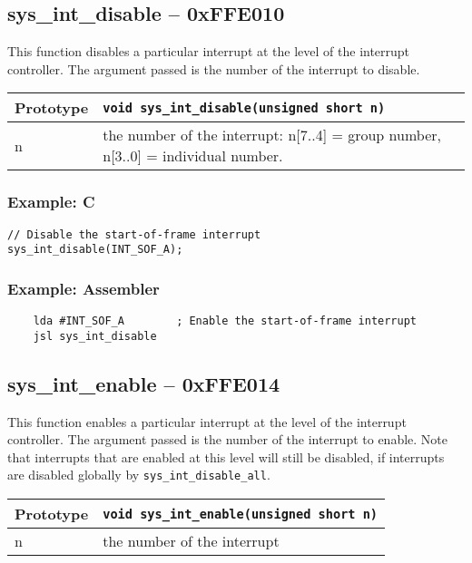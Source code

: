 \subsection*{sys\_int\_disable -- 0xFFE010}
This function disables a particular interrupt at the level of the interrupt controller. The argument passed is the number of the interrupt to disable.

\bigskip

\begin{tabular}{|l||l|} \hline
Prototype & \lstinline!void sys_int_disable(unsigned short n)! \\ \hline
n & the number of the interrupt: n[7..4] = group number, n[3..0] = individual number. \\ \hline
\end{tabular}

\subsubsection*{Example: C}
\begin{lstlisting}
// Disable the start-of-frame interrupt
sys_int_disable(INT_SOF_A);
\end{lstlisting}

\subsubsection*{Example: Assembler}
\begin{verbatim}
    lda #INT_SOF_A        ; Enable the start-of-frame interrupt
    jsl sys_int_disable
\end{verbatim}

\subsection*{sys\_int\_enable -- 0xFFE014}
This function enables a particular interrupt at the level of the interrupt controller. The argument passed is the number of the interrupt to enable. Note that interrupts that are enabled at this level will still be disabled, if interrupts are disabled globally by \verb+sys_int_disable_all+.

\bigskip

\begin{tabular}{|l||l|} \hline
Prototype & \lstinline!void sys_int_enable(unsigned short n)! \\ \hline
n & the number of the interrupt \\ \hline
\end{tabular}

